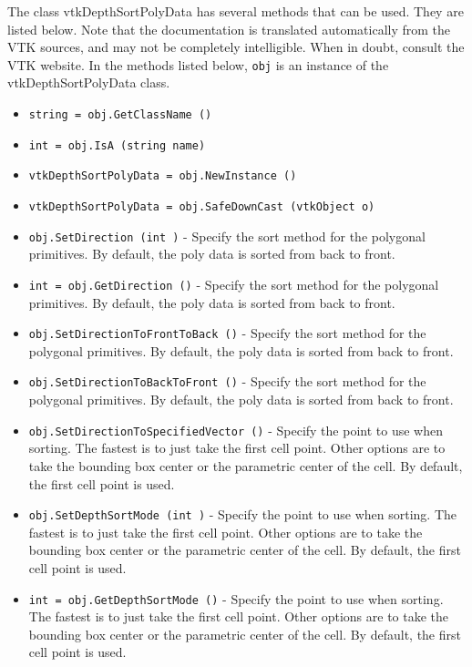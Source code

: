 The class vtkDepthSortPolyData has several methods that can be used.
  They are listed below.
Note that the documentation is translated automatically from the VTK sources,
and may not be completely intelligible.  When in doubt, consult the VTK website.
In the methods listed below, \verb|obj| is an instance of the vtkDepthSortPolyData class.
\begin{itemize}
\item  \verb|string = obj.GetClassName ()|

\item  \verb|int = obj.IsA (string name)|

\item  \verb|vtkDepthSortPolyData = obj.NewInstance ()|

\item  \verb|vtkDepthSortPolyData = obj.SafeDownCast (vtkObject o)|

\item  \verb|obj.SetDirection (int )| -  Specify the sort method for the polygonal primitives. By default, the
 poly data is sorted from back to front.

\item  \verb|int = obj.GetDirection ()| -  Specify the sort method for the polygonal primitives. By default, the
 poly data is sorted from back to front.

\item  \verb|obj.SetDirectionToFrontToBack ()| -  Specify the sort method for the polygonal primitives. By default, the
 poly data is sorted from back to front.

\item  \verb|obj.SetDirectionToBackToFront ()| -  Specify the sort method for the polygonal primitives. By default, the
 poly data is sorted from back to front.

\item  \verb|obj.SetDirectionToSpecifiedVector ()| -  Specify the point to use when sorting. The fastest is to just
 take the first cell point. Other options are to take the bounding
 box center or the parametric center of the cell. By default, the
 first cell point is used.

\item  \verb|obj.SetDepthSortMode (int )| -  Specify the point to use when sorting. The fastest is to just
 take the first cell point. Other options are to take the bounding
 box center or the parametric center of the cell. By default, the
 first cell point is used.

\item  \verb|int = obj.GetDepthSortMode ()| -  Specify the point to use when sorting. The fastest is to just
 take the first cell point. Other options are to take the bounding
 box center or the parametric center of the cell. By default, the
 first cell point is used.


\end{itemize}
